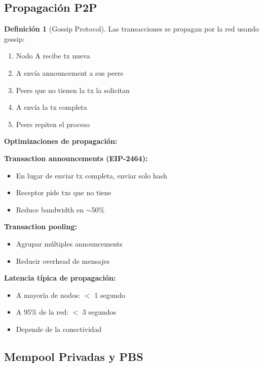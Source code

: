 \documentclass[11pt,a4paper,twoside,openright]{book}
\theoremstyle{definition}
\newtheorem{definition}{Definición}[chapter]
\theoremstyle{plain}
\theoremstyle{remark}
\begin{document}
\subsection{Propagación P2P}

\begin{definition}[Gossip Protocol]
Las transacciones se propagan por la red usando gossip:
\begin{enumerate}
    \item Nodo A recibe tx nueva
    \item A envía announcement a sus peers
    \item Peers que no tienen la tx la solicitan
    \item A envía la tx completa
    \item Peers repiten el proceso
\end{enumerate}
\end{definition}

\begin{mathnote}
\textbf{Optimizaciones de propagación:}

\textbf{Transaction announcements (EIP-2464):}
\begin{itemize}
    \item En lugar de enviar tx completa, enviar solo hash
    \item Receptor pide txs que no tiene
    \item Reduce bandwidth en $\sim$50\%
\end{itemize}

\textbf{Transaction pooling:}
\begin{itemize}
    \item Agrupar múltiples announcements
    \item Reducir overhead de mensajes
\end{itemize}

\textbf{Latencia típica de propagación:}
\begin{itemize}
    \item A mayoría de nodos: $<$ 1 segundo
    \item A 95\% de la red: $<$ 3 segundos
    \item Depende de la conectividad
\end{itemize}
\end{mathnote}

\subsection{Mempool Privadas y PBS}
\end{document}
